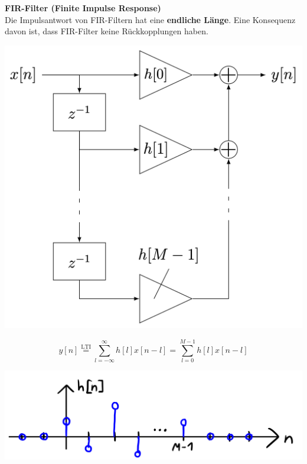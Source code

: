 \documentclass[11pt]{article}
\begin{document}
\noindent
\begin{minipage}[t]{0.48\textwidth} %
    \textbf{FIR-Filter (Finite Impulse Response)}\\[0.5em]
    Die Impulsantwort von FIR-Filtern hat eine \textbf{endliche Länge}. Eine Konsequenz davon ist, dass FIR-Filter keine Rückkopplungen haben.\\
    \vspace*{-0.5cm}
    \begin{center}
        \includegraphics[width=0.7\linewidth]{docimgs/FIR.png}
    \end{center}
    $$y[n] \overset{\text{LTI}}{=} \sum_{l=-\infty}^\infty h[l] x[n-l] = \sum_{l=0}^{M-1} h[l]x[n-l] $$
    \vspace*{-0.5cm}
    \begin{center}
        \includegraphics[width=0.8\linewidth]{docimgs/bsp_fir.jpeg}
    \end{center}
\end{minipage}
\hfill
\end{document}
